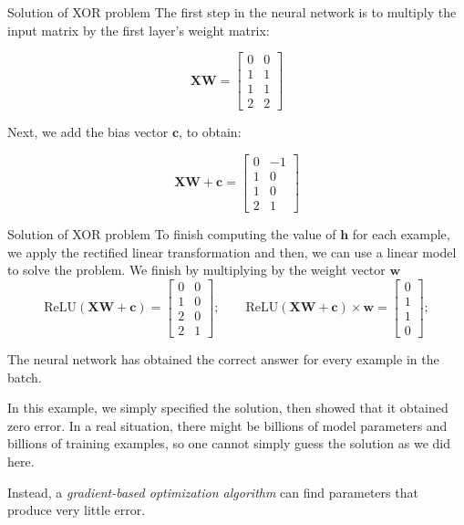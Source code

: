 \documentclass[10pt]{beamer}
\begin{document}
	\begin{frame}{Solution of XOR problem}
		The first step in the neural network is to multiply the input matrix by the first layer's weight matrix:
		
		$$\bm{XW}=\begin{bmatrix}
		0&0\\
		1&1\\
		1&1\\
		2&2
		\end{bmatrix}$$
		
		Next, we add the bias vector $\bm{c}$, to obtain:
		
		$$\bm{XW}+\bm{c}=\begin{bmatrix}
		0&-1\\
		1&0\\
		1&0\\
		2&1
		\end{bmatrix}$$
	\end{frame}

	\begin{frame}{Solution of XOR problem}
		To finish computing the value of $\bm{h}$ for each example, we apply the rectified linear transformation and then, we can use a linear model to solve the problem. We finish by multiplying by the weight vector $\bm{w}$
		$$\mathrm{ReLU}(\bm{XW}+\bm{c})=\begin{bmatrix}
		0&0\\
		1&0\\
		2&0\\
		2&1
		\end{bmatrix};\qquad\mathrm{ReLU}(\bm{XW}+\bm{c})\times \bm{w}=\begin{bmatrix}
		0\\
		1\\
		1\\
		0
		\end{bmatrix};$$
		
		The neural network has obtained the correct answer for every example in the batch.
		
		In this example, we simply specified the solution, then showed that it obtained zero error. In a real situation, there might be billions of model parameters and billions of training examples, so one cannot simply guess the solution as we did here.
		
		Instead, a \emph{gradient-based optimization algorithm} can find parameters that produce very little error.
	\end{frame}
	
\end{document}
